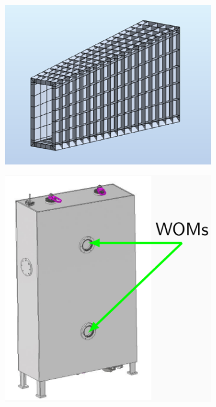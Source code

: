 \begin{figure}
	\centering
	\begin{subfigure}[b]{0.32\textwidth}
		\centering
		\includegraphics[width=1.\textwidth]{pictures/sbt_structure_sceleton}
		\caption{}
		\label{fig:sbt_structure_sceleton}
	\end{subfigure}
	\begin{subfigure}[b]{0.24\textwidth}
		\centering
		\includegraphics[width=1.\textwidth]{pictures/sbt_structure_cell}

\end{subfigure}
\end{figure}
